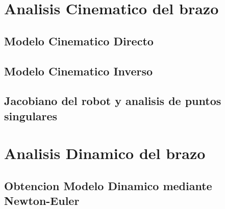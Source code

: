 \section{Analisis Cinematico del brazo}
	\subsection{Modelo Cinematico Directo}
	\subsection{Modelo Cinematico Inverso}
	\subsection{Jacobiano del robot y analisis de puntos singulares}
	
\section{Analisis Dinamico del brazo}
	\subsection{Obtencion Modelo Dinamico mediante Newton-Euler}
	